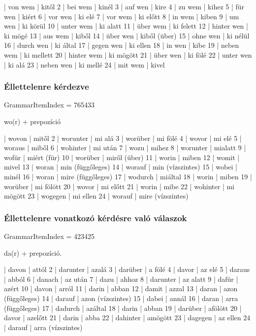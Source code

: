 \documentclass{article}
\newenvironment{desc}{\verbatim}{\endverbatim}
\newenvironment{exmp}{\verbatim}{\endverbatim}
\begin{document}
\begin{exmp}
1 | von wem | kitől
2 | bei wem | kinél
3 | auf wen | kire
4 | zu wem | kihez
5 | für wen | kiért
6 | vor wen | ki elé
7 | vor wem | ki előtt
8 | in wem | kiben
9 | um wen | ki körül
10 | unter wem | ki alatt
11 | über wem | ki felett
12 | hinter wen | ki mögé
13 | aus wem | kiből
14 | über wen | kiből (über)
15 | ohne wen | ki nélül
16 | durch wen | ki által
17 | gegen wen | ki ellen
18 | in wen | kibe
19 | neben wem | ki mellett
20 | hinter wem | ki mögött
21 | über wen | ki fölé
22 | unter wen | ki alá
23 | neben wen | ki mellé
24 | mit wem | kivel
\end{exmp}

\subsubsection{Éllettelenre kérdezve}

GrammarItemIndex = 765433

\begin{desc}
wo(r) + prepozíció
\end{desc}

\begin{exmp}
1 | wovon | mitől
2 | worunter | mi alá
3 | worüber | mi fölé
4 | wovor | mi elé
5 | woraus | miből
6 | wohinter | mi után
7 | wozu | mihez
8 | worunter | mialatt
9 | wofür | miért (für)
10 | worüber | miről (über)
11 | worin | miben
12 | womit | mivel
13 | woran | min (függőleges)
14 | worauf | min (vízszintes)
15 | wobei | minél
16 | woran | mire (függőleges)
17 | wodurch | miáltal
18 | worin | miben
19 | worüber | mi fölött
20 | wovor | mi előtt
21 | worin | mibe
22 | wohinter | mi mögött
23 | wogegen | mi ellen
24 | worauf | mire (vízszintes)
\end{exmp}

\subsubsection{Éllettelenre vonatkozó kérdésre való válaszok}

GrammarItemIndex = 423425

\begin{desc}
da(r) + prepozíció.
\end{desc}

\begin{exmp}
1 | davon | attól
2 | darunter | azalá
3 | darüber | a fölé
4 | davor | az elé
5 | daraus | abból
6 | danach | az után
7 | dazu | ahhoz
8 | darunter | az alatt
9 | dafür | azért
10 | davon | arról
11 | darin | abban
12 | damit | azzal
13 | daran | azon (függőleges)
14 | darauf | azon (vízszintes)
15 | dabei | annál
16 | daran | arra (függőleges)
17 | dadurch | azáltal
18 | darin | abban
19 | darüber | afölött
20 | davor | azelőtt
21 | darin | abba
22 | dahinter | amögött
23 | dagegen | az ellen
24 | darauf | arra (vízszintes)
\end{exmp}
\end{document}
